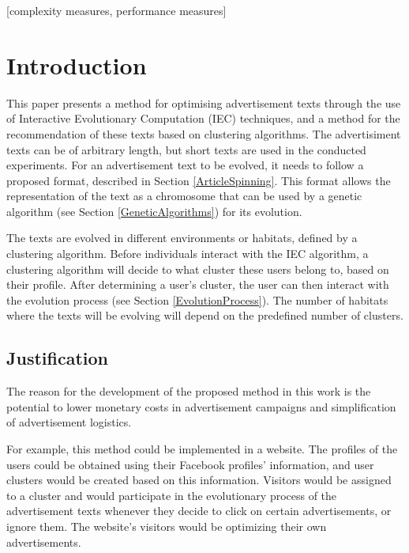 \documentclass{acm_proc_article-sp}
\begin{document}
[complexity measures, performance measures]


\section{Introduction}

This paper presents a method for optimising advertisement
texts through the use of Interactive Evolutionary Computation (IEC)
techniques, and a method for the recommendation of these texts based
on clustering algorithms. The advertisiment texts can be of arbitrary length, but
short texts are used in the conducted experiments. For an
advertisement text to be evolved, it needs to follow a proposed
format, described in Section \ref{ArticleSpinning}. This format allows
the representation of the text as a chromosome that can be used by a
genetic algorithm (see Section \ref{GeneticAlgorithms}) for its evolution.

The texts are evolved in different environments or habitats, defined
by a clustering algorithm. Before individuals interact with the
IEC algorithm, a clustering algorithm will decide to what cluster these
users belong to, based on their profile. After determining a user's cluster, the user can then
interact with the evolution process (see Section
\ref{EvolutionProcess}). The number of habitats where the texts will
be evolving will depend on the predefined number of clusters.

\subsection{Justification}

The reason for the development of the proposed method in this work is
the potential to lower monetary costs in advertisement campaigns and
simplification of advertisement logistics.

For example, this method could be implemented in a website. The
profiles of the users could be obtained using their Facebook profiles' information,
and user clusters would be created based on this information. Visitors
would be assigned to a cluster and would participate in the
evolutionary process of the advertisement texts whenever they decide
to click on certain advertisements, or ignore them. The website's
visitors would be optimizing their own advertisements.
\end{document}
